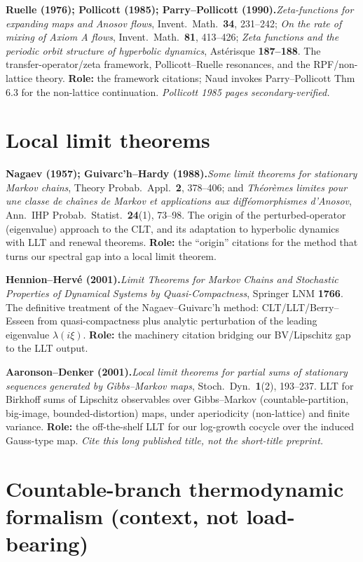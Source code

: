 \documentclass[11pt]{article}
\newcommand{\entry}[2]{\medskip\noindent\textbf{#1}\quad #2\par}
\begin{document}
\entry{Ruelle (1976); Pollicott (1985); Parry--Pollicott (1990).}{\emph{Zeta-functions
for expanding maps and Anosov flows}, Invent.\ Math.\ \textbf{34}, 231--242;
\emph{On the rate of mixing of Axiom A flows}, Invent.\ Math.\ \textbf{81},
413--426; \emph{Zeta functions and the periodic orbit structure of hyperbolic
dynamics}, Ast\'erisque \textbf{187--188}. The transfer-operator/zeta framework,
Pollicott--Ruelle resonances, and the RPF/non-lattice theory. \textbf{Role:}
the framework citations; Naud invokes Parry--Pollicott Thm 6.3 for the
non-lattice continuation. \emph{Pollicott 1985 pages secondary-verified.}}

\section{Local limit theorems}

\entry{Nagaev (1957); Guivarc'h--Hardy (1988).}{\emph{Some limit theorems for
stationary Markov chains}, Theory Probab.\ Appl.\ \textbf{2}, 378--406; and
\emph{Th\'eor\`emes limites pour une classe de cha\^\i nes de Markov et
applications aux diff\'eomorphismes d'Anosov}, Ann.\ IHP Probab.\ Statist.\
\textbf{24}(1), 73--98. The origin of the perturbed-operator (eigenvalue)
approach to the CLT, and its adaptation to hyperbolic dynamics with LLT and
renewal theorems. \textbf{Role:} the ``origin'' citations for the method that
turns our spectral gap into a local limit theorem.}

\entry{Hennion--Herv\'e (2001).}{\emph{Limit Theorems for Markov Chains and
Stochastic Properties of Dynamical Systems by Quasi-Compactness}, Springer LNM
\textbf{1766}. The definitive treatment of the Nagaev--Guivarc'h method:
CLT/LLT/Berry--Esseen from quasi-compactness plus analytic perturbation of the
leading eigenvalue $\lambda(i\xi)$. \textbf{Role:} the machinery citation
bridging our BV/Lipschitz gap to the LLT output.}

\entry{Aaronson--Denker (2001).}{\emph{Local limit theorems for partial sums of
stationary sequences generated by Gibbs--Markov maps}, Stoch.\ Dyn.\ \textbf{1}(2),
193--237. LLT for Birkhoff sums of Lipschitz observables over Gibbs--Markov
(countable-partition, big-image, bounded-distortion) maps, under aperiodicity
(non-lattice) and finite variance. \textbf{Role:} the off-the-shelf LLT for our
log-growth cocycle over the induced Gauss-type map. \emph{Cite this long
published title, not the short-title preprint.}}

\section{Countable-branch thermodynamic formalism (context, not load-bearing)}
\end{document}
